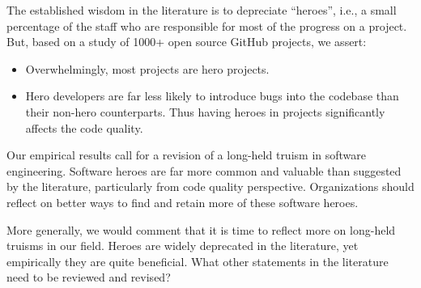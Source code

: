 \documentclass[smallextended]{svjour3}
\newcommand{\bi}{\begin{itemize}}
\newcommand{\ei}{\end{itemize}}
\begin{document}
The established wisdom in the literature is to depreciate ``heroes'',
i.e., a small percentage of the staff who are responsible for most of the progress on a project.
But, based on a study of 1000+ open source GitHub projects,
we assert:
\bi
\item  Overwhelmingly, most projects are hero projects.
\item   Hero developers are far less likely to introduce bugs into the codebase than their non-hero counterparts. Thus having heroes in projects significantly affects the code quality.
\ei
Our empirical results call for a revision of a long-held truism in software engineering.
Software heroes are far more common and valuable than suggested by the literature,
particularly from code quality perspective. Organizations should reflect on better ways
to find and retain more of these software heroes.

More generally, we would  comment that  it is time
to reflect more on long-held truisms in our field. Heroes are widely deprecated in the literature, yet empirically they are quite beneficial. 
 What other statements in the literature need to be
reviewed and revised?






\end{document}
